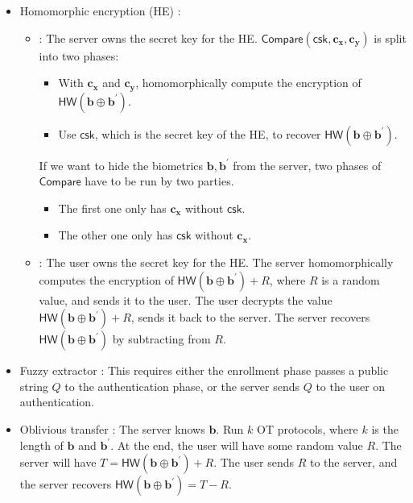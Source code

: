 \begin{itemize}
	\item Homomorphic encryption (HE) \cite{10.1007/978-3-642-01957-9_7, 10.1007/978-3-642-40588-4_5, pradel2021privacypreservingbiometricmatchingusing}:
	\begin{itemize}
		\item \cite{10.1007/978-3-642-40588-4_5}: The server owns the secret key for the HE. $\textsf{Compare}(\textsf{csk}, \mathbf{c_x}, \mathbf{c_y})$ is split into two phases:
			\begin{itemize}
				\item With $\mathbf{c_x}$ and $\mathbf{c_y}$, homomorphically compute the encryption of $\textsf{HW}(\mathbf{b} \oplus \mathbf{b}^\prime)$.
				\item Use $\textsf{csk}$, which is the secret key of the HE, to recover $\textsf{HW}(\mathbf{b} \oplus \mathbf{b}^\prime)$.
			\end{itemize}
			If we want to hide the biometrics $\mathbf{b}, \mathbf{b}^\prime$ from the server, two phases of $\textsf{Compare}$ have to be run by two parties.
			\begin{itemize}
				\item The first one only has $\mathbf{c_x}$ without $\textsf{csk}$.
				\item The other one only has $\textsf{csk}$ without $\mathbf{c_x}$.
			\end{itemize}
		\item \cite{10.1007/978-3-642-01957-9_7, pradel2021privacypreservingbiometricmatchingusing}: The user owns the secret key for the HE. The server homomorphically computes the encryption of $\textsf{HW}(\mathbf{b} \oplus \mathbf{b}^\prime) + R$, where $R$ is a random value, and sends it to the user. The user decrypts the value $\textsf{HW}(\mathbf{b} \oplus \mathbf{b}^\prime) + R$, sends it back to the server. The server recovers $\textsf{HW}(\mathbf{b} \oplus \mathbf{b}^\prime)$ by subtracting from $R$.

	\end{itemize}

	\item Fuzzy extractor \cite{10.1145/1030083.1030096, 7980010}: This requires either the enrollment phase passes a public string $Q$ to the authentication phase, or the server sends $Q$ to the user on authentication.

	\item Oblivious transfer \cite{cryptoeprint:2012/586}: The server knows $\mathbf{b}$. Run $k$ OT protocols, where $k$ is the length of $\mathbf{b}$ and $\mathbf{b}^\prime$. At the end, the user will have some random value $R$. The server will have $T = \textsf{HW}(\mathbf{b} \oplus \mathbf{b}^\prime) + R$. The user sends $R$ to the server, and the server recovers $\textsf{HW}(\mathbf{b} \oplus \mathbf{b}^\prime) = T - R$.

\end{itemize}

\fi


\newpage



% 

\pagebreak

\nocite{*}
\printbibliography



